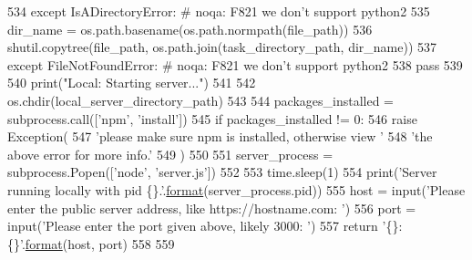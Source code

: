 \begin{DoxyCode}
534         \textcolor{keywordflow}{except} IsADirectoryError:  \textcolor{comment}{# noqa: F821 we don't support python2}
535             dir\_name = os.path.basename(os.path.normpath(file\_path))
536             shutil.copytree(file\_path, os.path.join(task\_directory\_path, dir\_name))
537         \textcolor{keywordflow}{except} FileNotFoundError:  \textcolor{comment}{# noqa: F821 we don't support python2}
538             \textcolor{keywordflow}{pass}
539 
540     print(\textcolor{stringliteral}{"Local: Starting server..."})
541 
542     os.chdir(local\_server\_directory\_path)
543 
544     packages\_installed = subprocess.call([\textcolor{stringliteral}{'npm'}, \textcolor{stringliteral}{'install'}])
545     \textcolor{keywordflow}{if} packages\_installed != 0:
546         \textcolor{keywordflow}{raise} Exception(
547             \textcolor{stringliteral}{'please make sure npm is installed, otherwise view '}
548             \textcolor{stringliteral}{'the above error for more info.'}
549         )
550 
551     server\_process = subprocess.Popen([\textcolor{stringliteral}{'node'}, \textcolor{stringliteral}{'server.js'}])
552 
553     time.sleep(1)
554     print(\textcolor{stringliteral}{'Server running locally with pid \{\}.'}.\hyperlink{namespaceparlai_1_1chat__service_1_1services_1_1messenger_1_1shared__utils_a32e2e2022b824fbaf80c747160b52a76}{format}(server\_process.pid))
555     host = input(\textcolor{stringliteral}{'Please enter the public server address, like https://hostname.com: '})
556     port = input(\textcolor{stringliteral}{'Please enter the port given above, likely 3000: '})
557     \textcolor{keywordflow}{return} \textcolor{stringliteral}{'\{\}:\{\}'}.\hyperlink{namespaceparlai_1_1chat__service_1_1services_1_1messenger_1_1shared__utils_a32e2e2022b824fbaf80c747160b52a76}{format}(host, port)
558 
559 
\end{DoxyCode}
\mbox{\label{namespaceparlai_1_1mturk_1_1core_1_1server__utils_a154e8cbb18375ff8fd6730154d312bbc}} 
